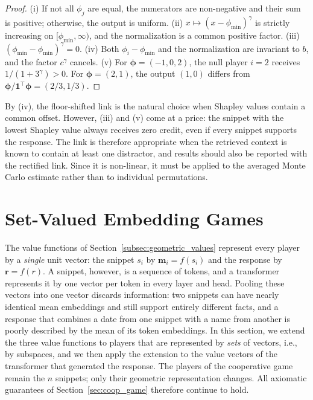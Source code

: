 \documentclass{article}
\begin{document}
\begin{proof}
(i) If not all $\phi_j$ are equal, the numerators are non-negative and their sum is positive; otherwise, the output is uniform. (ii) $x \mapsto (x - \phi_{\min})^\gamma$ is strictly increasing on $[\phi_{\min}, \infty)$, and the normalization is a common positive factor. (iii) $(\phi_{\min} - \phi_{\min})^\gamma = 0$. (iv) Both $\phi_i - \phi_{\min}$ and the normalization are invariant to $b$, and the factor $c^\gamma$ cancels. (v) For $\boldsymbol{\phi} = (-1, 0, 2)$, the null player $i = 2$ receives $1/(1 + 3^\gamma) > 0$. For $\boldsymbol{\phi} = (2, 1)$, the output $(1, 0)$ differs from $\boldsymbol{\phi}/\mathbf{1}^\top\boldsymbol{\phi} = (2/3, 1/3)$.
\end{proof}

By (iv), the floor-shifted link is the natural choice when Shapley values contain a common offset. However, (iii) and (v) come at a price: the snippet with the lowest Shapley value always receives zero credit, even if every snippet supports the response. The link is therefore appropriate when the retrieved context is known to contain at least one distractor, and results should also be reported with the rectified link. Since it is non-linear, it must be applied to the averaged Monte Carlo estimate rather than to individual permutations.




\section{Set-Valued Embedding Games}
\label{sec:set_embeddings}

The value functions of Section~\ref{subsec:geometric_values} represent every player by a \emph{single} unit vector: the snippet $s_i$ by $\mathbf{m}_i = f(s_i)$ and the response by $\mathbf{r} = f(r)$. A snippet, however, is a sequence of tokens, and a transformer represents it by one vector per token in every layer and head. Pooling these vectors into one vector discards information: two snippets can have nearly identical mean embeddings and still support entirely different facts, and a response that combines a date from one snippet with a name from another is poorly described by the mean of its token embeddings. In this section, we extend the three value functions to players that are represented by \emph{sets} of vectors, i.e., by subspaces, and we then apply the extension to the value vectors of the transformer that generated the response. The players of the cooperative game remain the $n$ snippets; only their geometric representation changes. All axiomatic guarantees of Section~\ref{sec:coop_game} therefore continue to hold.
\end{document}
